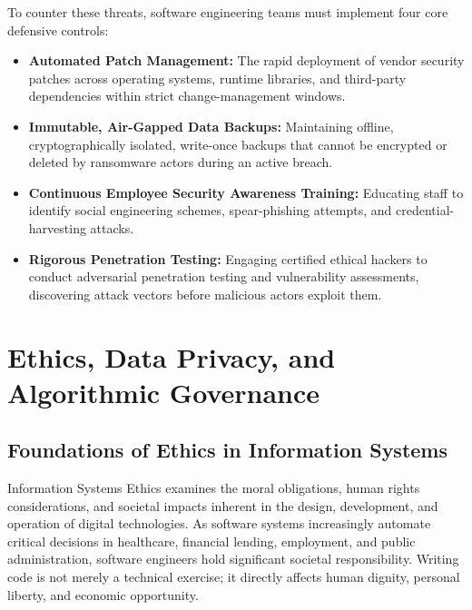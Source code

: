 \documentclass[11pt,a4paper]{article}
\begin{document}
To counter these threats, software engineering teams must implement four core defensive controls:
\begin{itemize}
    \item \textbf{Automated Patch Management:} The rapid deployment of vendor security patches across operating systems, runtime libraries, and third-party dependencies within strict change-management windows.
    \item \textbf{Immutable, Air-Gapped Data Backups:} Maintaining offline, cryptographically isolated, write-once backups that cannot be encrypted or deleted by ransomware actors during an active breach.
    \item \textbf{Continuous Employee Security Awareness Training:} Educating staff to identify social engineering schemes, spear-phishing attempts, and credential-harvesting attacks.
    \item \textbf{Rigorous Penetration Testing:} Engaging certified ethical hackers to conduct adversarial penetration testing and vulnerability assessments, discovering attack vectors before malicious actors exploit them.
\end{itemize}

\section[Ethics and Algorithmic Governance]{Ethics, Data Privacy, and Algorithmic Governance}
\label{sec:ethics}

\subsection{Foundations of Ethics in Information Systems}
Information Systems Ethics examines the moral obligations, human rights considerations, and societal impacts inherent in the design, development, and operation of digital technologies. As software systems increasingly automate critical decisions in healthcare, financial lending, employment, and public administration, software engineers hold significant societal responsibility. Writing code is not merely a technical exercise; it directly affects human dignity, personal liberty, and economic opportunity.
\end{document}
